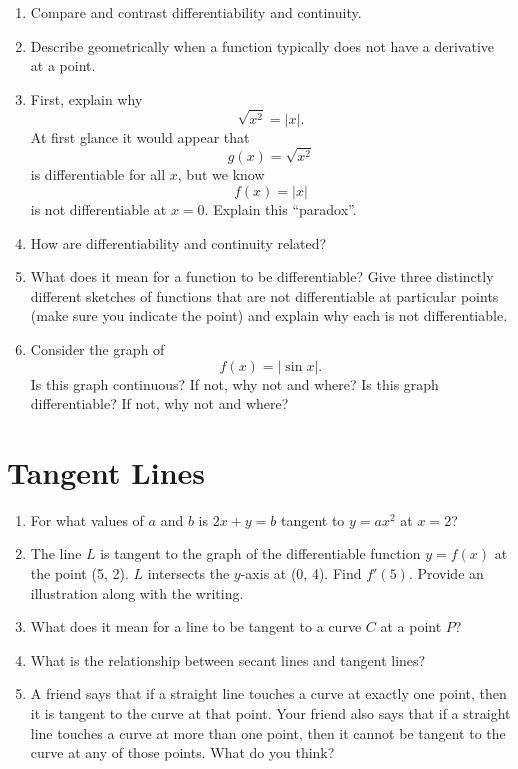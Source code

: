 \begin{enumerate}
\item  Compare and contrast differentiability and continuity.

\item  Describe geometrically when a function typically does not have a derivative at a point.   \cite{FWG}

\item  First, explain why $$\sqrt {x^2 }  = \left| x \right|.$$  At first glance it would appear that $$g(x) = \sqrt {x^2 } $$ is differentiable for all $x$, but we know $$f(x) = \left| x \right|$$ is not differentiable at $x = 0$.  Explain this ``paradox''.

\item  How are differentiability and continuity related?   \cite{FWG}

\item  What does it mean for a function to be differentiable?  Give three distinctly different sketches of functions that are not differentiable at particular points (make sure you indicate the point) and explain why each is not differentiable.

\item  Consider the graph of $$f(x) = \left| {\sin x} \right|.$$  Is this graph continuous?  If not, why not and where?  Is this graph differentiable?  If not, why not and where? \end{enumerate}\section{Tangent Lines}\begin{enumerate}

\item  For what values of $a$ and $b$ is $2x + y = b$ tangent to $y = ax^2$ at $x = 2$?  

\item  The line $L$ is tangent to the graph of the differentiable function $y = f(x)$ at the point (5, 2).  $L$ intersects the $y$-axis at (0, 4).  Find $f'(5).$  Provide an illustration along with the writing.

\item  What does it mean for a line to be tangent to a curve $C$ at a point $P$?   \cite{FWG}

\item  What is the relationship between secant lines and tangent lines?

\item  A friend says that if a straight line touches a curve at exactly one point, then it is tangent to the curve at that point. Your friend also says that if a straight line touches a curve at more than one point, then it cannot be tangent to the curve at any of those points.  What do you think?


\end{enumerate}
